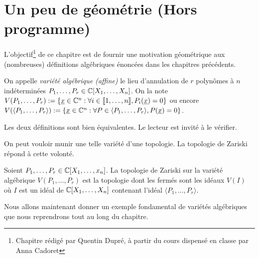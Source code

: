 \chapter{Un peu de géométrie (Hors programme)}

L'objectif\footnote{Chapitre rédigé par Quentin Dupré, à partir du
  cours dispensé en classe par Anna Cadoret} de ce chapitre est de
fournir une motivation géométrique aux (nombreuses) définitions
algébriques énoncées dans les chapitres précédents.

\begin{definition}
  On appelle \textit{variété algébrique (affine)} le lieu d'annulation
  de $r$ polynômes à $n$ indéterminées
  $P_1,\dotsc,P_r\in\mathbb{C}[X_1,\dotsc,X_n]$. On la note
  $V(P_1,\dotsc,P_r):=\{\underline{x}\in\mathbb{C}^n:\forall i\in\llbracket
  1,\dotsc,n\rrbracket, P_i(\underline{x})=0\}$ ou encore $V(\langle
  P_1,\dotsc,P_r\rangle):=\{\underline{x}\in\mathbb{C}^n:\forall P\in\langle
  P_1,\dotsc,P_r\rangle, P(\underline{x})=0\}$.
\end{definition}

\begin{remarque}
  Les deux définitions sont bien équivalentes. Le lecteur est invité à
  le vérifier.
\end{remarque}

On peut vouloir munir une telle variété d'une topologie. La topologie
de Zariski répond à cette volonté.

\begin{definition}
  Soient $P_1,\dotsc,P_r\in\mathbb{C}[X_1,\dotsc,x_n]$. La topologie de
  Zariski sur la variété algébrique $V(P_1,\dotsc,P_r)$ est la
  topologie dont les fermés sont les idéaux $V(I)$ où $I$ est un idéal
  de $\mathbb{C}[X_1,\dotsc,X_n]$ contenant l'idéal $\langle P_1,\dotsc,P_r\rangle$.
\end{definition}

Nous allons maintenant donner un exemple fondamental de variétés
algébriques que nous reprendrons tout au long du chapitre.

